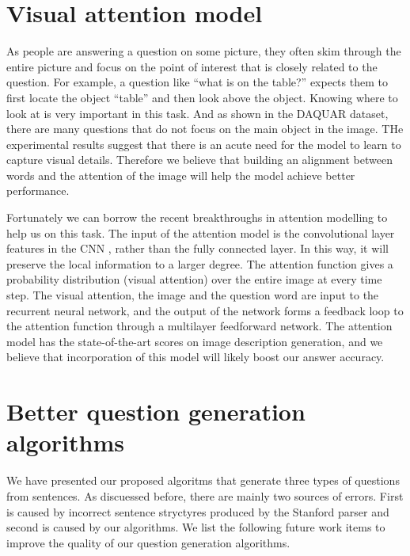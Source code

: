 \section{Visual attention model}
As people are answering a question on some picture, they often skim through the entire picture and focus on the point of interest that is closely related to the question. For example, a question like ``what is on the table?'' expects them to first locate the object ``table'' and then look above the object. Knowing where to look at is very important in this task. And as shown in the DAQUAR dataset, there are many questions that do not focus on the main object in the image. THe experimental results suggest that there is an acute need for the model to learn to capture visual details. Therefore we believe that building an alignment between words and the attention of the image will help the model achieve better performance.

Fortunately we can borrow the recent breakthroughs in attention modelling \cite{xu15} to help us on this task. The input of the attention model is the convolutional layer features in the CNN \cite{simonyan14}, rather than the fully connected layer. In this way, it will preserve the local information to a larger degree. The attention function gives a probability distribution (visual attention) over the entire image at every time step. The visual attention, the image and the question word are input to the recurrent neural network, and the output of the network forms a feedback loop to the attention function through a multilayer feedforward network. The attention model has the state-of-the-art scores on image description generation, and we believe that incorporation of this model will likely boost our answer accuracy.

\section{Better question generation algorithms}
We have presented our proposed algoritms that generate three types of questions from sentences. As discuessed before, there are mainly two sources of errors. First is caused by incorrect sentence stryctyres produced by the Stanford parser and second is caused by our algorithms. We list the following future work items to improve the quality of our question generation algorithms.

